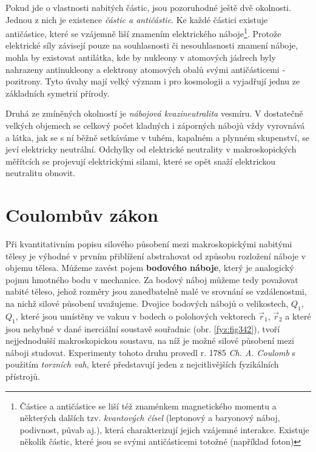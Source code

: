   Pokud jde o vlastnosti nabitých částic, jsou pozoruhodné ještě dvě okolnosti. Jednou z nich je 
  existence \emph{částic a antičástic}. Ke každé částici existuje antičástice, které se vzájemně 
  liší znamením elektrického náboje\footnote{Částice a antičástice se liší též znaménkem
  magnetického momentu a některých dalších tzv. \emph{kvantových čísel} (leptonový a  baryonový 
  náboj, podivnost, půvab aj.), která charakterizují jejich vzájemné interakce. Existuje několik 
  částic, které jsou se svými antičásticemi totožné (například foton)}. Protože elektrické síly 
  závisejí pouze na souhlasnosti či nesouhlasnosti znamení náboje, mohla by existovat antilátka, 
  kde by nukleony v atomových jádrech byly nahrazeny antinukleony a elektrony atomových obalů svými 
  antičásticemi - pozitrony. Tyto úvahy mají velký význam i pro kosmologii a vyjadřují jednu ze 
  základních symetrií přírody.
  
  Druhá ze zmíněných okolností je \emph{nábojová kvazineutralita} vesmíru. V dostatečně velkých 
  objemech se celkový počet kladných i záporných nábojů vždy vyrovnává a látka, jak se s ní běžně 
  setkáváme v tuhém, kapalném a plynném skupenství, se jeví elektricky neutrální. Odchylky od 
  elektrické neutrality v makroskopických měřítcích se projevují elektrickými silami, které se opět 
  snaží elektrickou neutralitu obnovit.
  
\section{Coulombův zákon}\label{fyz:IIIchapIsecII}
  Při kvantitativním popisu silového působení mezi makroskopickými nabitými tělesy je výhodné v 
  prvním přiblížení abstrahovat od způsobu rozložení náboje v objemu tělesa. Můžeme zavést pojem 
  \textbf{bodového náboje}, který je analogický pojmu hmotného bodu v mechanice. Za bodový náboj 
  můžeme tedy považovat nabité těleso, jehož rozměry jsou zanedbatelně malé ve srovnání se 
  vzdálenostmi, na nichž silové působení uvažujeme. Dvojice bodových nábojů o velikostech, 
  \(Q_1\), \(Q_1\), které jsou umístěny ve vakuu v bodech o polohových vektorech \(\vec{r}_1\), 
  \(\vec{r}_2\) a které jsou nehybné v dané inerciální soustavě souřadnic (obr. \ref{fyz:fig342}), 
  tvoří nejjednodušší makroskopickou soustavu, na níž je možné silové působení mezi náboji 
  studovat. Experimenty tohoto druhu provedl r. 1785 \emph{Ch. A. Coulomb} s použitím 
  \emph{torzních vah}, které představují jeden z nejcitlivějších fyzikálních přístrojů. 

